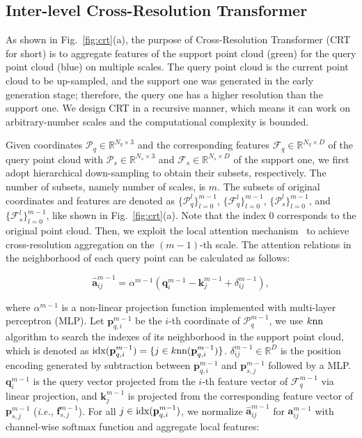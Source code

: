 \documentclass[letterpaper]{article} %
\newcommand{\ve}[1]{\mathbf{#1}} %
\newcommand{\ma}[1]{\mathrm{#1}} %
\begin{document}
\subsection{Inter-level Cross-Resolution Transformer}
As shown in Fig.~\ref{fig:crt}(a), the purpose of Cross-Resolution Transformer (CRT for short) is to aggregate features of the support point cloud (green) for the query point cloud (blue) on multiple scales.
The query point cloud is the current point cloud to be up-sampled, and the support one was generated in the early generation stage; therefore, the query one has a higher resolution than the support one.
We design CRT in a  recursive manner, which means it can work on arbitrary-number scales and the computational complexity is bounded.

Given coordinates $\mathcal{P}_q \in {\mathbb R}^{N_q \times 3}$ and the corresponding features $\mathcal{F}_q  \in {\mathbb R}^{N_q \times D}$ of the query point cloud with $\mathcal{P}_s \in {\mathbb R}^{N_s \times 3}$ and  $\mathcal{F}_s  \in {\mathbb R}^{N_s \times D}$ of the support one,
we first adopt hierarchical down-sampling to obtain their subsets, respectively.
The number of subsets, namely number of scales, is $m$.
The subsets of original  coordinates and features are denoted as $\{\mathcal{P}_q^l\}_{l=0}^{m-1}$, $\{\mathcal{F}_q^l\}_{l=0}^{m-1}$, $\{\mathcal{P}_s^l\}_{l=0}^{m-1}$, and $\{\mathcal{F}_s^l\}_{l=0}^{m-1}$, like shown in Fig.~\ref{fig:crt}(a).
Note that the index $0$ corresponds to the original point cloud.
Then, we exploit the local attention mechanism~\cite{zhao2021point} to achieve cross-resolution aggregation on the $(m-1)$-th scale.
The attention relations in the neighborhood of each query point can be calculated as follows:

\begin{equation}
{\hat{\ve{a}} ^{m-1}_{ij}} = {\alpha^{m-1}} (\ve{q}^{m-1}_i - \ve{k}^{m-1}_j+\delta^{m-1}_{ij}),
\end{equation}

{\noindent}where ${\alpha^{m-1}}$  is a non-linear projection function implemented with multi-layer perceptron (MLP).
Let $\ve{p}^{m-1}_{q, i}$ be the $i$-th coordinate of $\mathcal{P}_q^{m-1}$, we use $k\rm nn$ algorithm to search the indexes of its neighborhood in the support point cloud, which is denoted as ${\rm idx}(\ve{p}^{m-1}_{q, i}) = \{j \in k{\rm nn}(\ve{p}^{m-1}_{q, i})\}$.
$\delta^{m-1}_{ij} \in \mathbb{R}^{D}$ is the position encoding generated by subtraction between $\ve{p}^{m-1}_{q,i}$  and $\ve{p}^{m-1}_{s, j}$ followed by a MLP.
$\ve{q}^{m-1}_i$ is the query vector projected from the $i$-th feature vector of $\mathcal{F}_q^{m-1}$ via linear projection, and $\ve{k}^{m-1}_j$ is projected from the corresponding feature vector of $\ve{p}^{m-1}_{s, j}$ ({\em i.e.}, $\ve{f}^{m-1}_{s, j}$).
For all $j \in {\rm idx}(\ve{p}^{m-1}_{q, i})$, we normalize ${\hat{\ve{a}} ^{m-1}_{ij}}$ for ${\ve{a}} ^{m-1}_{ij}$ with channel-wise $\ma{softmax}$ function and  aggregate local features:
\end{document}
